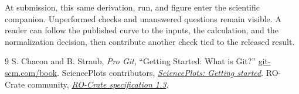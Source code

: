 \documentclass[11pt]{article}
\begin{document}
At submission, this same derivation, run, and figure enter the scientific companion. Unperformed checks and unanswered questions remain visible. A reader can follow the published curve to the inputs, the calculation, and the normalization decision, then contribute another check tied to the released result.

\begin{thebibliography}{9}
\small
{} S. Chacon and B. Straub, \emph{Pro Git}, ``Getting Started: What is Git?'' \href{https://git-scm.com/book/en/v2/Getting-Started-What-is-Git\%3F}{git-scm.com/book}.
 SciencePlots contributors, \href{https://scienceplots.readthedocs.io/en/sphinx-documentation/guides/getting_started.html}{\emph{SciencePlots: Getting started}}.
 RO-Crate community, \href{https://www.researchobject.org/ro-crate/specification/1.3/index.html}{\emph{RO-Crate specification 1.3}}.
\end{thebibliography}
\end{document}
